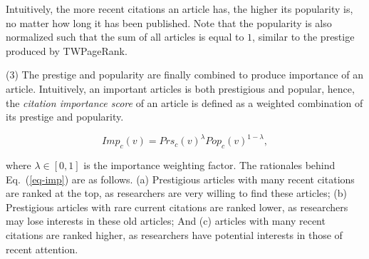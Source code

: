 
Intuitively, the more recent citations an article has, the higher its popularity is, no matter how long it has been published.
%
%
Note that the popularity is also normalized such that the sum of  all articles is equal to $1$, similar to the prestige produced by TWPageRank.

\sstab(3) The prestige and popularity are finally combined to produce importance of an article. Intuitively, an important articles is both prestigious and popular, hence, the {\em citation importance score} of an article is defined as a weighted combination of its prestige and popularity.

\vspace{-2ex}
\begin{small}
\begin{equation}\label{eq-imp}
Imp_c(v) = Prs_c(v)^\lambda Pop_c(v)^{1-\lambda},
\end{equation}
\end{small}
\noindent where $\lambda \in [0,1]$ is the importance weighting factor.
The rationales behind Eq.~(\ref{eq-imp}) are as follows. (a) Prestigious articles with many recent citations are ranked at the top, as researchers are very willing to find these articles; (b) Prestigious articles with rare current citations are ranked lower, as researchers may lose interests in these old articles; And (c) articles with many recent citations are ranked higher, as researchers have potential interests in those of recent attention.



